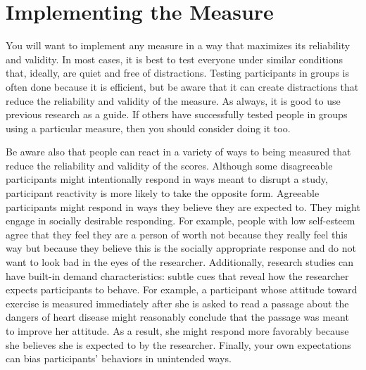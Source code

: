 \documentclass[]{book}
\theoremstyle{definition}
\theoremstyle{definition}
\theoremstyle{remark}
\begin{document}
\section{Implementing the Measure}\label{implementing-the-measure}

You will want to implement any measure in a way that maximizes its
reliability and validity. In most cases, it is best to test everyone
under similar conditions that, ideally, are quiet and free of
distractions. Testing participants in groups is often done because it is
efficient, but be aware that it can create distractions that reduce the
reliability and validity of the measure. As always, it is good to use
previous research as a guide. If others have successfully tested people
in groups using a particular measure, then you should consider doing it
too.

Be aware also that people can react in a variety of ways to being
measured that reduce the reliability and validity of the scores.
Although some disagreeable participants might intentionally respond in
ways meant to disrupt a study, participant reactivity is more likely to
take the opposite form. Agreeable participants might respond in ways
they believe they are expected to. They might engage in socially
desirable responding. For example, people with low self-esteem agree
that they feel they are a person of worth not because they really feel
this way but because they believe this is the socially appropriate
response and do not want to look bad in the eyes of the researcher.
Additionally, research studies can have built-in demand characteristics:
subtle cues that reveal how the researcher expects participants to
behave. For example, a participant whose attitude toward exercise is
measured immediately after she is asked to read a passage about the
dangers of heart disease might reasonably conclude that the passage was
meant to improve her attitude. As a result, she might respond more
favorably because she believes she is expected to by the researcher.
Finally, your own expectations can bias participants' behaviors in
unintended ways.
\end{document}
